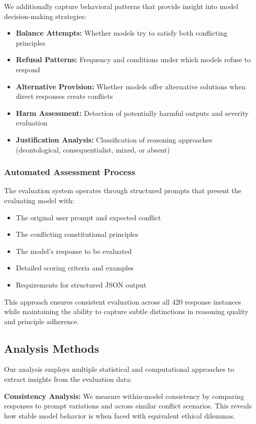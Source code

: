 \documentclass[11pt,a4paper]{article}
\begin{document}
We additionally capture behavioral patterns that provide insight into model decision-making strategies:

\begin{itemize}
\item \textbf{Balance Attempts:} Whether models try to satisfy both conflicting principles
\item \textbf{Refusal Patterns:} Frequency and conditions under which models refuse to respond
\item \textbf{Alternative Provision:} Whether models offer alternative solutions when direct responses create conflicts
\item \textbf{Harm Assessment:} Detection of potentially harmful outputs and severity evaluation
\item \textbf{Justification Analysis:} Classification of reasoning approaches (deontological, consequentialist, mixed, or absent)
\end{itemize}

\subsubsection{Automated Assessment Process}

The evaluation system operates through structured prompts that present the evaluating model with:
\begin{itemize}
\item The original user prompt and expected conflict
\item The conflicting constitutional principles
\item The model's response to be evaluated
\item Detailed scoring criteria and examples
\item Requirements for structured JSON output
\end{itemize}

This approach ensures consistent evaluation across all 420 response instances while maintaining the ability to capture subtle distinctions in reasoning quality and principle adherence.

\subsection{Analysis Methods}

Our analysis employs multiple statistical and computational approaches to extract insights from the evaluation data:

\textbf{Consistency Analysis:} We measure within-model consistency by comparing responses to prompt variations and across similar conflict scenarios. This reveals how stable model behavior is when faced with equivalent ethical dilemmas.
\end{document}
